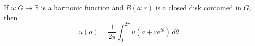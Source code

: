If $u: G \to \mathbb{R}$ is a harmonic function and $\overline{B}(a; r)$ is a closed disk contained in $G$, then
$$u(a) = \frac{1}{2\pi} \int_0^{2\pi} u(a + re^{i\theta}) \, d\theta.$$
